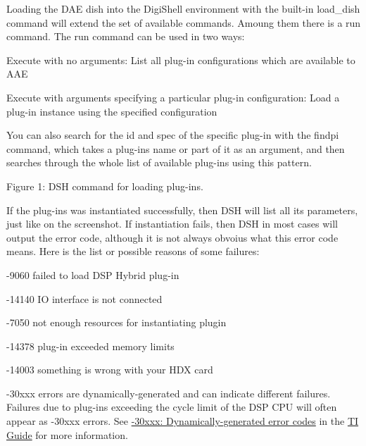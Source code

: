 Loading the D\+A\+E dish into the Digi\+Shell environment with the built-\/in {\ttfamily load\+\_\+dish} command will extend the set of available commands. Amoung them there is a {\ttfamily run} command. The {\ttfamily run} command can be used in two ways\+:


\begin{DoxyItemize}
\item Execute with no arguments\+: List all plug-\/in configurations which are available to A\+A\+E  
\item Execute with arguments specifying a particular plug-\/in configuration\+: Load a plug-\/in instance using the specified configuration  
\end{DoxyItemize}

You can also search for the id and spec of the specific plug-\/in with the {\ttfamily findpi} command, which takes a plug-\/in\textquotesingle{}s name or part of it as an argument, and then searches through the whole list of available plug-\/ins using this pattern.

 Figure 1\+: D\+S\+H command for loading plug-\/ins.

If the plug-\/ins was instantiated successfully, then D\+S\+H will list all its parameters, just like on the screenshot. If instantiation fails, then D\+S\+H in most cases will output the error code, although it is not always obvoius what this error code means. Here is the list or possible reasons of some failures\+: 
\begin{DoxyItemize}
\item -\/9060 failed to load D\+S\+P Hybrid plug-\/in ~\newline
  
\item -\/14140 I\+O interface is not connected ~\newline
  
\item -\/7050 not enough resources for instantiating plugin ~\newline
  
\item -\/14378 plug-\/in exceeded memory limits ~\newline
  
\item -\/14003 something is wrong with your H\+D\+X card ~\newline
  
\end{DoxyItemize}

-\/30xxx errors are dynamically-\/generated and can indicate different failures. Failures due to plug-\/ins exceeding the cycle limit of the D\+S\+P C\+P\+U will often appear as -\/30xxx errors. See \hyperlink{a00362_subsection__30xxx_dynamic_error_codes}{-\/30xxx\+: Dynamically-\/generated error codes} in the \hyperlink{a00362}{T\+I Guide} for more information.

